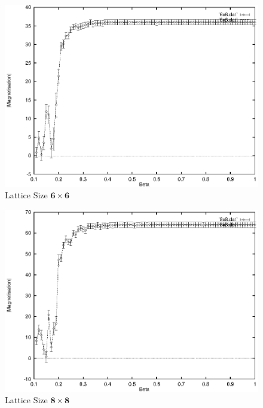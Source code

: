 \documentclass[a4paper]{IEEEtran}
\begin{document}
    \begin{figure} 
    \caption{Lattice Size $\mathbf{6 \times 6}$}
    \label{fig:6x6-2} 
    \begin{center}
        \includegraphics[width=0.99\columnwidth]{6x6_2.eps}
    \end{center}
    \end{figure} 

    \begin{figure} 
    \caption{Lattice Size $\mathbf{8 \times 8}$}
    \label{fig:8x8-2} 
    \begin{center}
        \includegraphics[width=0.99\columnwidth]{8x8_2.eps}
    \end{center}
    \end{figure} 
\end{document}
